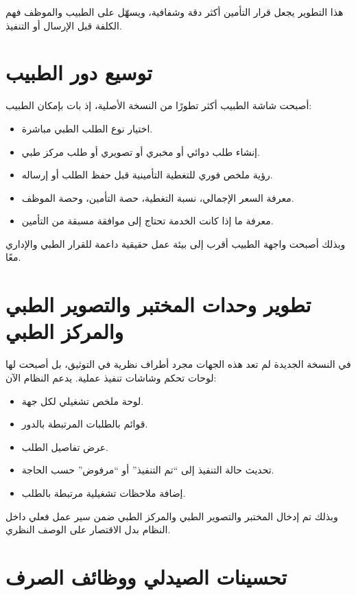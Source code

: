 \documentclass[12pt,a4paper]{report}
\begin{document}
هذا التطوير يجعل قرار التأمين أكثر دقة وشفافية، ويسهّل على الطبيب والموظف فهم الكلفة قبل الإرسال أو التنفيذ.

\section{توسيع دور الطبيب}

أصبحت شاشة الطبيب أكثر تطورًا من النسخة الأصلية، إذ بات بإمكان الطبيب:

\begin{itemize}[itemsep=4pt]
  \item اختيار نوع الطلب الطبي مباشرة.
  \item إنشاء طلب دوائي أو مخبري أو تصويري أو طلب مركز طبي.
  \item رؤية ملخص فوري للتغطية التأمينية قبل حفظ الطلب أو إرساله.
  \item معرفة السعر الإجمالي، نسبة التغطية، حصة التأمين، وحصة الموظف.
  \item معرفة ما إذا كانت الخدمة تحتاج إلى موافقة مسبقة من التأمين.
\end{itemize}

وبذلك أصبحت واجهة الطبيب أقرب إلى بيئة عمل حقيقية داعمة للقرار الطبي والإداري معًا.

\section{تطوير وحدات المختبر والتصوير الطبي والمركز الطبي}

في النسخة الجديدة لم تعد هذه الجهات مجرد أطراف نظرية في التوثيق، بل أصبحت لها لوحات تحكم وشاشات تنفيذ عملية. يدعم النظام الآن:

\begin{itemize}[itemsep=4pt]
  \item لوحة ملخص تشغيلي لكل جهة.
  \item قوائم بالطلبات المرتبطة بالدور.
  \item عرض تفاصيل الطلب.
  \item تحديث حالة التنفيذ إلى ``تم التنفيذ'' أو ``مرفوض'' حسب الحاجة.
  \item إضافة ملاحظات تشغيلية مرتبطة بالطلب.
\end{itemize}

وبذلك تم إدخال المختبر والتصوير الطبي والمركز الطبي ضمن سير عمل فعلي داخل النظام بدل الاقتصار على الوصف النظري.

\section{تحسينات الصيدلي ووظائف الصرف}
\end{document}
